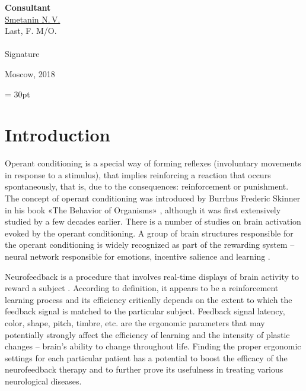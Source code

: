 \documentclass[14pt,a4paper]{scrartcl}
\begin{document}
\begin{titlepage}
	\hfill\begin{minipage}{0.4\textwidth}
		\textbf{Consultant}\\[0.3cm]
		\underline{Smetanin N.\,V.} \\
		\scriptsize{Last, F. M/O.}\\\\
		\underline{\hspace{7cm}}
		\scriptsize{Signature}\\
			\end{minipage}

	    \vfill
	    \vfill
	    \vfill  

		\begin{center}
		\vfill
		  Moscow, 2018
		\end{center}
	\end{titlepage}


\newpage
\tableofcontents
\fancyhf{} 
\renewcommand{\headrulewidth}{0pt} 
\footskip = 30pt
\fancyfoot[R]{\thepage} 
\pagestyle{fancy}
\fancypagestyle{plain}{
  \fancyhf{}
  \renewcommand{\headrulewidth}{0pt}
  \fancyhf[lef,rof]{\thepage}
}

\newpage
\section{Introduction}
\label{sec:Introduction}

Operant conditioning is a special way of forming reflexes (involuntary movements in response to a stimulus), that implies reinforcing a reaction that occurs spontaneously, that is, due to the consequences: reinforcement or punishment. The concept of operant conditioning was introduced by Burrhus Frederic Skinner in his book «The Behavior of Organisms» \cite{Jones1939}, although it was first extensively studied by \cite{Thorndike1898} a few decades earlier. There is a number of studies on brain activation evoked by the operant conditioning. A group of brain structures responsible for the operant conditioning is widely recognized as part of the rewarding system – neural network responsible for emotions, incentive salience and learning \cite{Schultz2015}. 

Neurofeedback is a procedure that involves real-time displays of brain activity to reward a subject \cite{Kamiya2011}. According to definition, it appears to be a reinforcement learning process and its efficiency critically depends on the extent to which the feedback signal is matched to the particular subject. Feedback signal latency, color, shape, pitch, timbre, etc. are the ergonomic parameters that may potentially strongly affect the efficiency of learning and the intensity of plastic changes – brain’s ability to change throughout life. Finding the proper ergonomic settings for each particular patient has a potential to boost the efficacy of the neurofeedback therapy and to further prove its usefulness in treating various neurological diseases.
\end{document}
